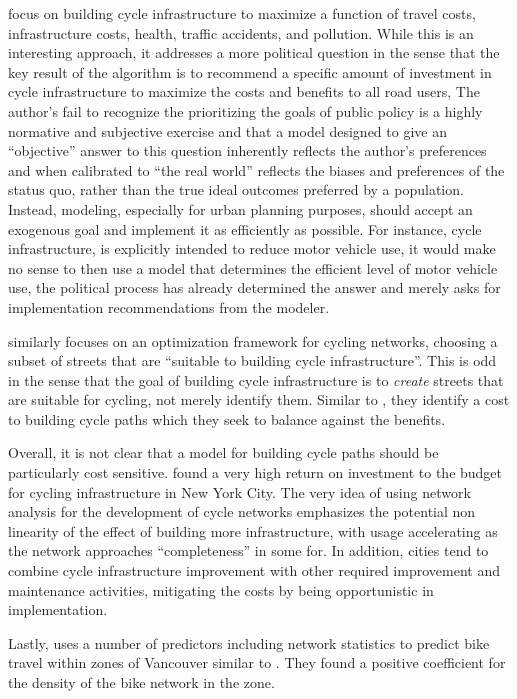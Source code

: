 \documentclass[11pt]{article} %
\begin{document}
\cite{doorley2019designing} focus on building cycle infrastructure to maximize a function of travel costs, infrastructure costs, health, traffic accidents, and pollution. While this is an interesting approach, it addresses a more political question in the sense that the key result of the algorithm is to recommend a specific amount of investment in cycle infrastructure to maximize the costs and benefits to all road users, The author's fail to recognize the prioritizing the goals of public policy is a highly normative and subjective exercise and that a model designed to give an ``objective'' answer to this question inherently reflects the author's preferences and when calibrated to ``the real world'' reflects the biases and preferences of the status quo, rather than the true ideal outcomes preferred by a population. Instead, modeling, especially for urban planning purposes, should accept an exogenous goal and implement it as efficiently as possible. For instance, cycle infrastructure, is explicitly intended to reduce motor vehicle use, it would make no sense to then use a model that determines the efficient level of motor vehicle use, the political process has already determined the answer and merely asks for implementation recommendations from the modeler. 

\cite{mauttone2017bicycle} similarly focuses on an optimization framework for cycling networks, choosing a subset of streets that are ``suitable to building cycle infrastructure''. This is odd in the sense that the goal of building cycle infrastructure is to \textit{create} streets that are suitable for cycling, not merely identify them. Similar to \cite{doorley2019designing}, they identify a cost to building cycle paths which they seek to balance against the benefits. 

Overall, it is not clear that a model for building cycle paths should be particularly cost sensitive. \cite{gu2017cost} found a very high return on investment to the budget for cycling infrastructure in New York City. The very idea of using network analysis for the development of cycle networks emphasizes the potential non linearity of the effect of building more infrastructure, with usage accelerating as the network approaches ``completeness'' in some for. In addition, cities tend to combine cycle infrastructure improvement with other required improvement and maintenance activities, mitigating the costs by being opportunistic in implementation. 

Lastly, \cite{osama2017models} uses a number of predictors including network statistics to predict bike travel within zones of Vancouver similar to \cite{schoner2014missing}. They found a positive coefficient for the density of the bike network in the zone. 
\end{document}
